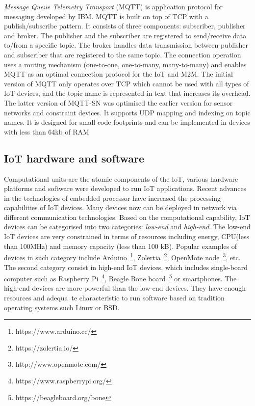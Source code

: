 \textit{Message Queue Telemetry Transport} (MQTT) is application protocol for messaging developed by IBM.
MQTT is built on top of TCP with a publish/subscribe pattern.
It consists of three components: subscriber, publisher and broker.
The publisher and the subscriber are registered to send/receive data to/from a specific topic.
The broker handles data transmission between publisher and subscriber that are registered to the same topic.
The connection operation uses a routing
mechanism (one-to-one, one-to-many, many-to-many) and enables
MQTT as an optimal connection protocol for the IoT
and M2M.
The initial version of MQTT only operates over TCP which cannot be used with all types of IoT devices, and the topic name 
is represented in text that increases its overhead.
The latter version of MQTT-SN was optimised the earlier version for sensor networks and constraint devices.
It supports UDP mapping and indexing on topic names. 
It is designed for small code footprints and can be implemented in devices with less than 64kb of RAM

\subsection{IoT hardware and software}

Computational units are the atomic components of the IoT, various hardware platforms and software were developed to run IoT applications. 
Recent advances in the technologies of embedded processor have increased the processing capabilities of IoT devices.
Many devices now can be deployed in network via different communication technologies.
Based on the computational capability, IoT devices can be categorised into two categories: \textit{low-end}  and \textit{high-end}.
The low-end IoT devices are very constrained in terms of resources including energy, CPU(less than 100MHz) and memory capacity (less than 100 kB).
Popular examples of devices in such category include 
Arduino~\footnote{https://www.arduino.cc/}, 
Zolertia~\footnote{https://zolertia.io/}, 
OpenMote node~\footnote{http://www.openmote.com/}, etc.
The second category consist in high-end IoT devices, which includes single-board computer such as Raspberry Pi~\footnote{https://www.raspberrypi.org/}, 
Beagle Bone board~\footnote{https://beagleboard.org/bone} or 
smartphones.
The high-end devices are more powerful than the low-end devices.
They have enough resources and adequa~\citep{Botta:2016}te characteristic to run software based on tradition operating systems such Linux or BSD. 



